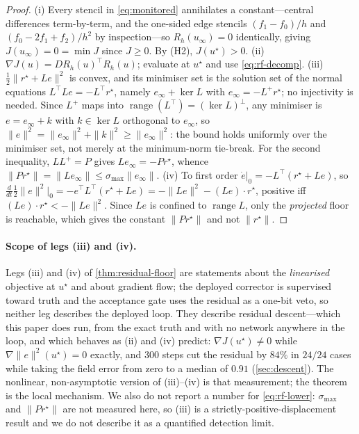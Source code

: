 \begin{proof}
(i) Every stencil in \eqref{eq:monitored} annihilates a constant---central differences
term-by-term, and the one-sided edge stencils $(f_1-f_0)/h$ and $(f_0-2f_1+f_2)/h^2$ by
inspection---so $R_h(u_\infty)=0$ identically, giving $J(u_\infty)=0=\min J$ since $J\ge0$.
By (H2), $J(u^\star)>0$.
(ii) $\nabla J(u)=DR_h(u)^\top R_h(u)$; evaluate at $u^\star$ and use \eqref{eq:rf-decomp}.
(iii) $\tfrac12\|r^\star+Le\|^2$ is convex, and its minimiser set is the solution set of the
normal equations $L^\top Le=-L^\top r^\star$, namely $e_\infty+\ker L$ with
$e_\infty=-L^{+}r^\star$; no injectivity is needed. Since $L^{+}$ maps into
$\operatorname{range}(L^\top)=(\ker L)^\perp$, any minimiser is $e=e_\infty+k$ with
$k\in\ker L$ orthogonal to $e_\infty$, so $\|e\|^2=\|e_\infty\|^2+\|k\|^2\ge\|e_\infty\|^2$:
the bound holds uniformly over the minimiser set, not merely at the minimum-norm
tie-break. For the second inequality, $LL^{+}=P$ gives $Le_\infty=-Pr^\star$, whence
$\|Pr^\star\|=\|Le_\infty\|\le\sigma_{\max}\|e_\infty\|$.
(iv) To first order $\dot e|_0=-L^\top(r^\star+Le)$, so
$\frac{d}{dt}\tfrac12\|e\|^2|_0=-e^\top L^\top(r^\star+Le)=-\|Le\|^2-(Le)\cdot r^\star$,
positive iff $(Le)\cdot r^\star<-\|Le\|^2$. Since $Le$ is confined to
$\operatorname{range}L$, only the \emph{projected} floor is reachable, which gives the
constant $\|Pr^\star\|$ and not $\|r^\star\|$.
\end{proof}

\paragraph{Scope of legs (iii) and (iv).}
Legs (iii) and (iv) of \autoref{thm:residual-floor} are statements about the
\emph{linearised} objective at $u^\star$ and
about gradient flow; the deployed corrector is supervised toward truth and the acceptance
gate uses the residual as a one-bit veto, so neither leg describes the deployed loop. They
describe residual descent---which this paper does run, from the exact truth and with no
network anywhere in the loop, and which behaves as (ii) and (iv) predict:
$\nabla J(u^\star)\neq0$ while $\nabla\|e\|^2(u^\star)=0$ exactly, and $300$ steps cut the
residual by $84\%$ in $24/24$ cases while taking the field error from zero to a median of
$0.91$ (\autoref{sec:descent}). The nonlinear, non-asymptotic version of (iii)--(iv) is
that measurement; the theorem is the local mechanism. We also do not report a number for
\eqref{eq:rf-lower}: $\sigma_{\max}$ and $\|Pr^\star\|$ are not measured here, so (iii) is
a strictly-positive-displacement result and we do not describe it as a quantified
detection limit.

